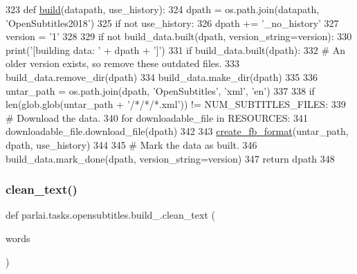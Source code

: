 \begin{DoxyCode}
323 \textcolor{keyword}{def }\hyperlink{namespaceparlai_1_1tasks_1_1opensubtitles_1_1build__2018_a2a3e9dd46ca9629e1540e3a67104340b}{build}(datapath, use\_history):
324     dpath = os.path.join(datapath, \textcolor{stringliteral}{'OpenSubtitles2018'})
325     \textcolor{keywordflow}{if} \textcolor{keywordflow}{not} use\_history:
326         dpath += \textcolor{stringliteral}{'\_no\_history'}
327     version = \textcolor{stringliteral}{'1'}
328 
329     \textcolor{keywordflow}{if} \textcolor{keywordflow}{not} build\_data.built(dpath, version\_string=version):
330         print(\textcolor{stringliteral}{'[building data: '} + dpath + \textcolor{stringliteral}{']'})
331         \textcolor{keywordflow}{if} build\_data.built(dpath):
332             \textcolor{comment}{# An older version exists, so remove these outdated files.}
333             build\_data.remove\_dir(dpath)
334         build\_data.make\_dir(dpath)
335 
336         untar\_path = os.path.join(dpath, \textcolor{stringliteral}{'OpenSubtitles'}, \textcolor{stringliteral}{'xml'}, \textcolor{stringliteral}{'en'})
337 
338         \textcolor{keywordflow}{if} len(glob.glob(untar\_path + \textcolor{stringliteral}{'/*/*/*.xml'})) != NUM\_SUBTITLES\_FILES:
339             \textcolor{comment}{# Download the data.}
340             \textcolor{keywordflow}{for} downloadable\_file \textcolor{keywordflow}{in} RESOURCES:
341                 downloadable\_file.download\_file(dpath)
342 
343         \hyperlink{namespaceparlai_1_1tasks_1_1opensubtitles_1_1build__2018_a94026ef98d87f9598f74647cda960c6f}{create\_fb\_format}(untar\_path, dpath, use\_history)
344 
345         \textcolor{comment}{# Mark the data as built.}
346         build\_data.mark\_done(dpath, version\_string=version)
347     \textcolor{keywordflow}{return} dpath
348 \end{DoxyCode}
\mbox{\label{namespaceparlai_1_1tasks_1_1opensubtitles_1_1build__2018_a1bee89083b3ee54e034611194dd4e8ae}} 
\subsubsection{\texorpdfstring{clean\+\_\+text()}{clean\_text()}}
{\footnotesize\ttfamily def parlai.\+tasks.\+opensubtitles.\+build\+\_.\+clean\+\_\+text (\begin{DoxyParamCaption}\item[{}]{words }\end{DoxyParamCaption})}



